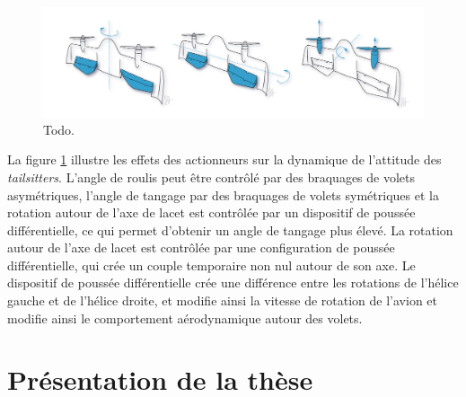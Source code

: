 \begin{figure}[ht!]
    \centerline{
    \includegraphics[trim=0cm 0cm 0cm 0cm,clip,width=0.8\columnwidth]{figures/imageActionnementDarko.png}}
    \caption{Todo.}
    \label{fig:actionDarko}
\end{figure}

La figure \ref{fig:actionDarko} illustre les effets des actionneurs sur la dynamique de l'attitude des \textit{tailsitters}. L'angle de roulis  peut être contrôlé par des braquages de volets asymétriques, l'angle de tangage par des braquages de volets symétriques et la rotation autour de l'axe de lacet est contrôlée par un dispositif de poussée différentielle, ce qui permet d'obtenir un angle de tangage plus élevé. La rotation autour de l'axe de lacet est contrôlée par une configuration de poussée différentielle, qui crée un couple temporaire non nul autour de son axe. Le dispositif de poussée différentielle crée une différence entre les rotations de l'hélice gauche et de l'hélice droite, et modifie ainsi la vitesse de rotation de l'avion et modifie ainsi le comportement aérodynamique autour des volets.

\section{Présentation de la thèse}


